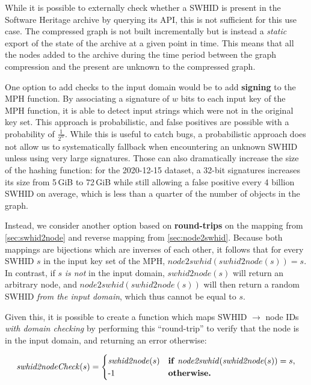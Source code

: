 While it is possible to externally check whether a \gls{SWHID} is present in
the Software Heritage archive by querying its API, this is not sufficient for
this use case. The compressed graph is not built incrementally but is instead a
\emph{static} export of the state of the archive at a given point in time. This
means that all the nodes added to the archive during the time period between
the graph compression and the present are unknown to the compressed graph.

One option to add checks to the input domain would be to add \textbf{signing} to
the \gls{MPH} function. By associating a signature of $w$ bits to each input
key of the \gls{MPH} function, it is able to detect input strings which were
not in the original key set. This approach is probabilistic, and false
positives are possible with a probability of {\Large $\frac{1}{2^w}$}. While
this is useful to catch bugs, a probabilistic approach does not allow us to
systematically fallback when encountering an unknown \gls{SWHID} unless using
very large signatures. Those can also dramatically increase the size of the
hashing function: for the 2020-12-15 dataset, a 32-bit signatures increases its
size from 5\,GiB to 72\,GiB while still allowing a false positive every 4
billion \gls{SWHID} on average, which is less than a quarter of the number of
objects in the graph.

Instead, we consider another option based on \textbf{round-trips} on the
mapping from \cref{sec:swhid2node} and reverse mapping from
\cref{sec:node2swhid}.  Because both mappings are bijections which are
inverses of each other, it follows that for every \gls{SWHID} $s$ in the input
key set of the \gls{MPH}, $\mathit{node2swhid}(\mathit{swhid2node}(s)) = s$.
In contrast, if $s$ \emph{is not} in the input domain, $\mathit{swhid2node}(s)$
will return an arbitrary node, and
$\mathit{node2swhid}(\mathit{swhid2node}(s))$ will then return a random
\gls{SWHID} \emph{from the input domain}, which thus cannot be equal to $s$.

Given this, it is possible to create a function which maps \gls{SWHID} $\to$
node IDs \emph{with domain checking} by performing this ``round-trip'' to
verify that the node is in the input domain, and returning an error otherwise:

\[
    \mathit{swhid2nodeCheck}(s) =
    \begin{cases}
        \mathit{swhid2node}(s) &
        \text{\textbf{if}}~\mathit{node2swhid}(\mathit{swhid2node}(s)) = s,\\
        \text{-1}            & \text{\textbf{otherwise.}}
    \end{cases}
\]

